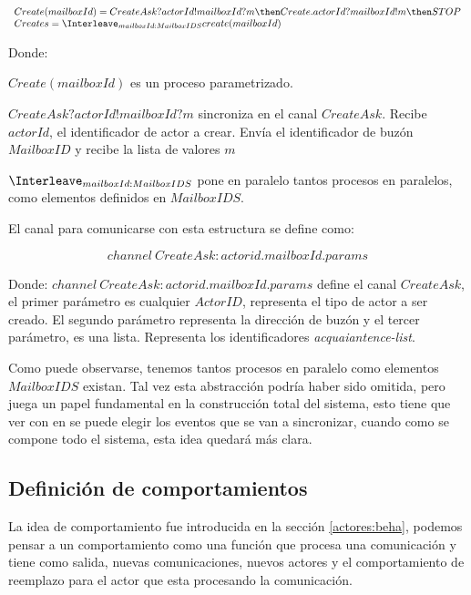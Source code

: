\[
\begin{array}{l}
Create(mailboxId) = CreateAsk?actorId!mailboxId?m \then Create.actorId?mailboxId!m \then STOP \\
Creates = \Interleave_{mailboxId : MailboxIDS} create(mailboxId)
\end{array}
\]

Donde:

\begin{description}
 \item $Create(mailboxId)$ es un proceso parametrizado.
 \item $CreateAsk?actorId!mailboxId?m$ sincroniza en el canal $CreateAsk$. Recibe $actorId$, el identificador de actor a crear. Envía el identificador de buzón $MailboxID$ y recibe la lista de valores $m$
 \item $\Interleave_{mailboxId : MailboxIDS}$ pone en paralelo tantos procesos en paralelos, como elementos definidos en $MailboxIDS$.  
\end{description}

El canal para comunicarse con esta estructura se define como:

\[
channel\ CreateAsk:actorid.mailboxId.params
\]

Donde: $channel\ CreateAsk:actorid.mailboxId.params$ define el canal $CreateAsk$, el primer parámetro es cualquier $ActorID$, representa el tipo de actor a ser creado. El segundo parámetro representa la dirección de buzón y el tercer parámetro, es una lista. Representa los identificadores \textit{acquaiantence-list}. 

Como puede observarse, tenemos tantos procesos en paralelo como elementos $MailboxIDS$ existan. Tal vez esta abstracción podría haber sido omitida, pero juega un papel fundamental en la construcción total del sistema, esto tiene que ver con en \CSP se puede elegir los eventos \cite[chap.~2,p.~55]{Roscoe:1997:TPC:550448} que se van a sincronizar, cuando como se compone todo el sistema, esta idea quedará más clara.

\subsection{Definición de comportamientos}
La idea de comportamiento fue introducida en la sección \ref{actores:beha}, podemos pensar a un comportamiento como una función que procesa una comunicación y tiene como salida, nuevas comunicaciones, nuevos actores y el comportamiento de reemplazo para el actor que esta procesando la comunicación.

